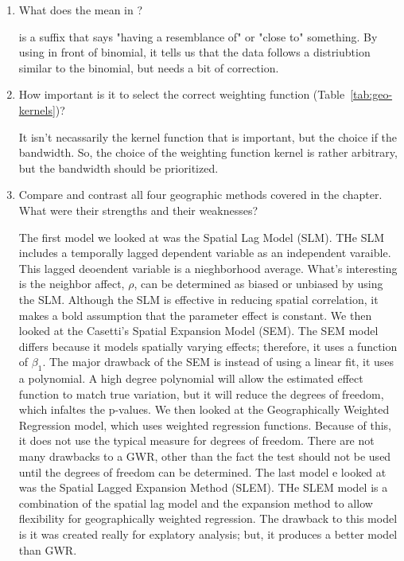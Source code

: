 \begin{enumerate}
 \item What does the  mean in ?
\begin{solution}
 is a suffix that says "having a resemblance of" or "close to" something. By using  in front of binomial, it tells us that the data follows a distriubtion similar to the binomial, but needs a bit of correction. 
\end{solution}
 
 \item How important is it to select the correct weighting function (Table~\ref{tab:geo-kernels})?
\begin{solution}
It isn't necassarily the kernel function that is important, but the choice if the bandwidth. So, the choice of the weighting function kernel is rather arbitrary, but the bandwidth should be prioritized.  
\end{solution}
 
 \item Compare and contrast all four geographic methods covered in the chapter. What were their strengths and their weaknesses? 
\begin{solution}
The first model we looked at was the Spatial Lag Model (SLM). THe SLM includes a temporally lagged dependent variable as an independent varaible. This lagged deoendent variable is a nieghborhood average. What's interesting is the neighbor affect, $\rho$, can be determined as biased or unbiased by using the SLM. Although the SLM is effective in reducing spatial correlation, it makes a bold assumption that the parameter effect is constant. We then looked at the Casetti's Spatial Expansion Model (SEM). The SEM model differs because it models spatially varying effects; therefore, it uses a function of $\beta_{1}$. The major drawback of the SEM is instead of using a linear fit, it uses a polynomial. A high degree polynomial will allow the estimated effect function to match true variation, but it will reduce the degrees of freedom, which infaltes the p-values. We then looked at the Geographically Weighted Regression model, which uses weighted regression functions. Because of this, it does not use the typical measure for degrees of freedom. There are not many drawbacks to a GWR, other than the fact the test should not be used until the degrees of freedom can be determined. The last model e looked at was the Spatial Lagged Expansion Method (SLEM). THe SLEM model is a combination of the spatial lag model and the expansion method to allow flexibility for geographically weighted regression. The drawback to this model is it was created really for explatory analysis; but, it produces a better model than GWR. 
\end{solution}

\end{enumerate}



